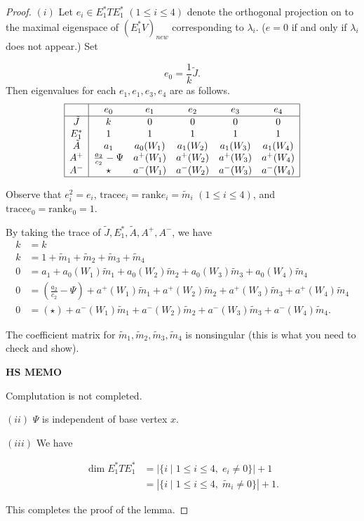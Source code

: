\documentclass[
]{book}
\theoremstyle{definition}
\theoremstyle{definition}
\theoremstyle{definition}
\theoremstyle{definition}
\theoremstyle{remark}
\begin{document}
\begin{proof}
\leavevmode

\((i)\) Let \(e_i\in E^*_1TE^*_1\) \((1\leq i\leq 4)\) denote the orthogonal projection on to the maximal eigenspace of \((E^*_1V)_{new}\) corresponding to \(\lambda_i\). (\(e=0\) if and only if \(\lambda_i\) does not appear.) Set

\[e_0 = \frac{1}{k}\tilde{J}.\]
Then eigenvalues for each \(e_1, e_1, e_3, e_4\) are as follows.
\[\begin{array}{|c|ccccc|} \hline
\text{} & e_0 & e_1 & e_2 & e_3 & e_4\\
\hline
\tilde{J} & k & 0 & 0 & 0 & 0\\
E^*_1 & 1 & 1 & 1 & 1 & 1 \\
\tilde{A} & a_1 & a_0(W_1) & a_1(W_2) & a_1(W_3) & a_1(W_4)\\
A^+ & \frac{a_2}{c_2}-\Psi & a^+(W_1)  & a^+(W_2)  & a^+(W_3)  & a^+(W_4)\\
A^- & \star & a^-(W_1)  & a^-(W_2)  & a^-(W_3)  & a^-(W_4)\\
\hline
\end{array}\]

Observe that \(e^2_i = e_i\), \(\mathrm{trace} e_i = \mathrm{rank}e_i = \tilde{m}_i\) \((1\leq i\leq 4)\), and \(\mathrm{trace} e_0 = \mathrm{rank}e_0 = 1\).

By taking the trace of \(\tilde{J}, E^*_1, \tilde{A}, A^+, A^-\), we have
\begin{align}
k & = k\\
k & = 1 + \tilde{m}_1 + \tilde{m}_2 + \tilde{m}_3 + \tilde{m}_4\\
0 & = a_1 + a_0(W_1)\tilde{m}_1 + a_0(W_2)\tilde{m}_2 + a_0(W_3)\tilde{m}_3 + a_0(W_4)\tilde{m}_4\\
0 & = \left(\frac{a_2}{c_2}-\Psi\right) + a^+(W_1)\tilde{m}_1 + a^+(W_2)\tilde{m}_2 + a^+(W_3)\tilde{m}_3 + a^+(W_4)\tilde{m}_4\\
0 & = \left(\star\right) + a^-(W_1)\tilde{m}_1 + a^-(W_2)\tilde{m}_2 + a^-(W_3)\tilde{m}_3 + a^-(W_4)\tilde{m}_4.
\end{align}

The coefficient matrix for \(\tilde{m}_1,\tilde{m}_2, \tilde{m}_3,\tilde{m}_4\) is nonsingular (this is what you need to check and show).

\textbf{HS MEMO}

Complutation is not completed.

\((ii)\) \(\Psi\) is independent of base vertex \(x\).

\((iii)\) We have

\begin{align}
\dim E^*_1TE^*_1 & = |\{i\mid 1\leq i\leq 4, \; e_i\neq 0\}| + 1\\
& = |\{i\mid 1\leq i\leq 4, \; \tilde{m}_i\neq 0\}| + 1.
\end{align}

This completes the proof of the lemma.

\end{proof}
\end{document}

